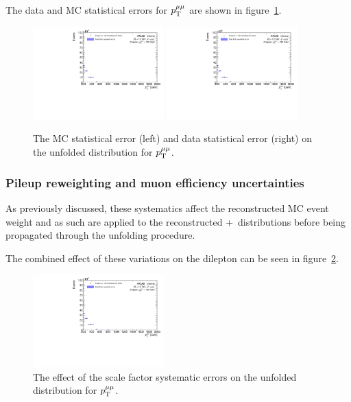 The data and MC statistical errors for $p_\mathrm{T}^{\mu\mu}$ are shown in figure~\ref{fig:MCDataStatErr}.

\begin{figure}[h!]
  \centering
  \includegraphics[page=29,width=0.45\textwidth]{figures/unfoldErrPlots.pdf}
  \includegraphics[page=30,width=0.45\textwidth]{figures/unfoldErrPlots.pdf}
  \caption{The MC statistical error (left) and data statistical error (right) on the unfolded distribution for $p_\mathrm{T}^{\mu\mu}$.}
  \label{fig:MCDataStatErr}
\end{figure}

\subsubsection{Pileup reweighting and muon efficiency uncertainties}
As previously discussed, these systematics affect the reconstructed MC event weight and as such are applied to the reconstructed \powheg+\pythia~distributions before being propagated through the unfolding procedure.

The combined effect of these variations on the dilepton \pt can be seen in figure~\ref{fig:SFSystErr}.

\begin{figure}[h!]
  \centering
  \includegraphics[page=25,width=0.45\textwidth]{figures/unfoldErrPlots.pdf}
  \caption{The effect of the scale factor systematic errors on the unfolded distribution for $p_\mathrm{T}^{\mu\mu}$.}
  \label{fig:SFSystErr}
\end{figure}

